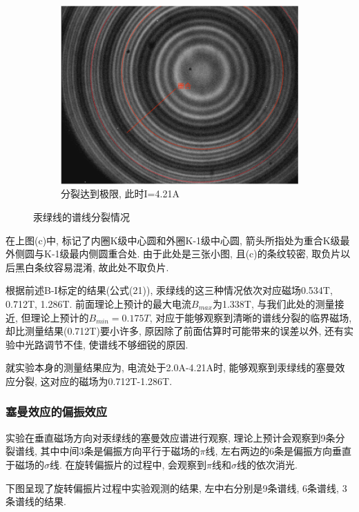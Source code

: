\documentclass[12pt,a4paper]{article}
\begin{document}
\begin{figure}[H]
\begin{subfigure}[b]{0.3\textwidth}
      \includegraphics[width=\textwidth]{4.21g.jpg}
      \caption{分裂达到极限, 此时I=4.21A}
    \end{subfigure}
    \caption{汞绿线的谱线分裂情况}
  \end{figure}

在上图(c)中, 标记了内圈K级中心圆和外圈K-1级中心圆, 箭头所指处为重合K级最外侧圆与K-1级最内侧圆重合处. 由于此处是三张小图, 且(c)的条纹较密, 
取负片以后黑白条纹容易混淆, 故此处不取负片. 

根据前述B-I标定的结果(公式(21)), 汞绿线的这三种情况依次对应磁场0.534T, 0.712T, 1.286T. 前面理论上预计的最大电流$B_{max}$为1.338T, 与我们此处的测量接近, 
但理论上预计的$B_{min}=0.175T$, 对应于能够观察到清晰的谱线分裂的临界磁场, 却比测量结果(0.712T)要小许多, 原因除了前面估算时可能带来的误差以外, 还有实验中光路调节不佳, 使谱线不够细锐的原因. 

就实验本身的测量结果应为, 电流处于2.0A-4.21A时, 能够观察到汞绿线的塞曼效应分裂, 这对应的磁场为0.712T-1.286T. 

\subsubsection{塞曼效应的偏振效应}
实验在垂直磁场方向对汞绿线的塞曼效应谱进行观察, 理论上预计会观察到9条分裂谱线, 其中中间3条是偏振方向平行于磁场的$\pi$线, 左右两边的6条是偏振方向垂直于磁场的$\sigma$线. 
在旋转偏振片的过程中, 会观察到$\pi$线和$\sigma$线的依次消光. 

下图呈现了旋转偏振片过程中实验观测的结果, 左中右分别是9条谱线, 6条谱线, 3条谱线的结果. 
\end{document}
